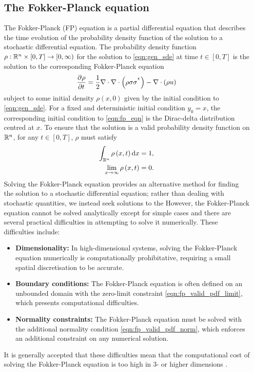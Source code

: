 \subsection{The Fokker-Planck equation}\label{sec:fp_eqn}
The Fokker-Planck (FP) equation is a partial differential equation that describes the time evolution of the probability density function of the solution to a stochastic differential equation.
The probability density function \(\rho: \mathbb{R}^n \times [0,T] \to [0,\infty)\) for the solution to \cref{eqn:gen_sde} at time \(t \in [0,T]\) is the solution to the corresponding Fokker-Planck equation \citep{Risken_2012_FokkerPlanckEquationMethods}
\begin{equation}
	\dpd{\rho}{t} = \frac12\nabla\cdot\nabla\cdot\left(\rho\sigma\sigma^{\T}\right) - \nabla\cdot\left(\rho u\right)
	\label{eqn:fp_eqn}
\end{equation}
subject to some initial density \(\rho\left(x,0\right)\) given by the initial condition to \cref{eqn:gen_sde}.
For a fixed and deterministic initial condition \(y_0 = x\), the corresponding initial condition to \cref{eqn:fp_eqn} is the Dirac-delta distribution centred at \(x\).
To ensure that the solution is a valid probability density function on \(\mathbb{R}^n\), for any \(t \in [0,T]\), \(\rho\) must satisfy
\begin{subequations}\label{eqn:fp_valid_pdf}
	\begin{align}
		\int_{\R^n}{\rho\left(x, t\right)\dif x} = 1, \label{eqn:fp_valid_pdf_norm} \\
		\lim_{x \to \infty}\rho\left(x,t\right) = 0. \label{eqn:fp_valid_pdf_limit}
	\end{align}
\end{subequations}
Solving the Fokker-Planck equation provides an alternative method for finding the solution to a stochastic differential equation; rather than dealing with stochastic quantities, we instead seek solutions to the
However, the Fokker-Planck equation cannot be solved analytically except for simple cases and there are several practical difficulties in attempting to solve it numerically.
These difficulties include:
\begin{itemize}
	\item \textbf{Dimensionality:} In high-dimensional systems, solving the Fokker-Planck equation numerically is computationally prohibitative, requiring a small spatial discretisation to be accurate.
	\item \textbf{Boundary conditions:} The Fokker-Planck equation is often defined on an unbounded domain with the zero-limit constraint \cref{eqn:fp_valid_pdf_limit}, which presents computational difficulties.
	\item \textbf{Normality constraints:} The Fokker-Planck equation must be solved with the additional normality condition \cref{eqn:fp_valid_pdf_norm}, which enforces an additional constraint on any numerical solution.
\end{itemize}
It is generally accepted that these difficulties mean that the computational cost of solving the Fokker-Planck equation is too high in \(3\)- or higher dimensions \citep{ZhaiEtAl_2022_DeepLearningMethod,Li_2019_DatadrivenMethodSteady,AllawalaMarston_2016_StatisticsStochasticallyForced}.

